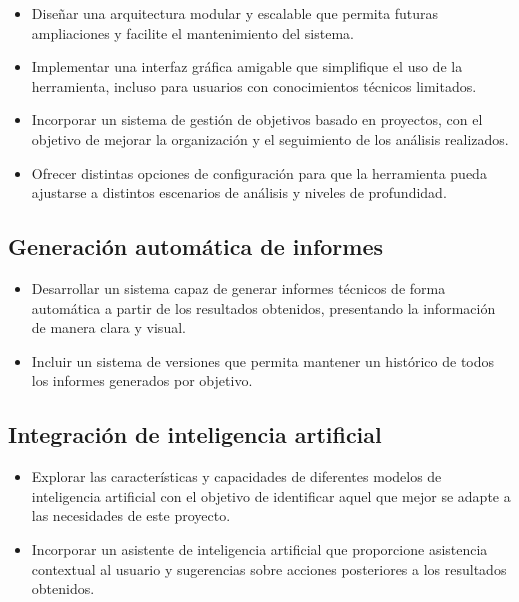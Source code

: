 \begin{parskipenv}
\begin{itemize}
  \item Diseñar una arquitectura modular y escalable que permita futuras ampliaciones y facilite el mantenimiento del sistema.
  
  \item Implementar una interfaz gráfica amigable que simplifique el uso de la herramienta, incluso para usuarios con conocimientos técnicos limitados.
  
  \item Incorporar un sistema de gestión de objetivos basado en proyectos, con el objetivo de mejorar la organización y el seguimiento de los análisis realizados.
  
  \item Ofrecer distintas opciones de configuración para que la herramienta pueda ajustarse a distintos escenarios de análisis y niveles de profundidad.
\end{itemize}

\subsection*{Generación automática de informes}
\begin{itemize}
  \item Desarrollar un sistema capaz de generar informes técnicos de forma automática a partir de los resultados obtenidos, presentando la información de manera clara y visual.

  \item Incluir un sistema de versiones que permita mantener un histórico de todos los informes generados por objetivo.
\end{itemize}

\subsection*{Integración de inteligencia artificial}
\begin{itemize}
  \item Explorar las características y capacidades de diferentes modelos de inteligencia artificial con el objetivo de identificar aquel que mejor se adapte a las necesidades de este proyecto.

  \item Incorporar un asistente de inteligencia artificial que proporcione asistencia contextual al usuario y sugerencias sobre acciones posteriores a los resultados obtenidos.
\end{itemize}


\end{parskipenv}